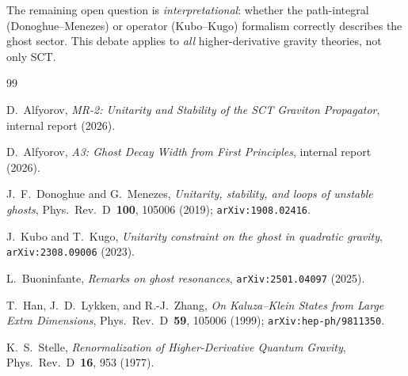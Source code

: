 \documentclass[11pt,a4paper]{article}
\begin{document}
The remaining open question is \emph{interpretational}: whether the
path-integral (Donoghue--Menezes) or operator (Kubo--Kugo) formalism
correctly describes the ghost sector.  This debate applies to \emph{all}
higher-derivative gravity theories, not only SCT.


\begin{thebibliography}{99}

D.~Alfyorov,
\textit{MR-2: Unitarity and Stability of the SCT Graviton Propagator},
internal report (2026).

D.~Alfyorov,
\textit{A3: Ghost Decay Width from First Principles},
internal report (2026).

J.~F.~Donoghue and G.~Menezes,
\textit{Unitarity, stability, and loops of unstable ghosts},
Phys.\ Rev.\ D~\textbf{100}, 105006 (2019);
\texttt{arXiv:1908.02416}.

J.~Kubo and T.~Kugo,
\textit{Unitarity constraint on the ghost in quadratic gravity},
\texttt{arXiv:2308.09006} (2023).

L.~Buoninfante,
\textit{Remarks on ghost resonances},
\texttt{arXiv:2501.04097} (2025).

T.~Han, J.~D.~Lykken, and R.-J.~Zhang,
\textit{On Kaluza--Klein States from Large Extra Dimensions},
Phys.\ Rev.\ D~\textbf{59}, 105006 (1999);
\texttt{arXiv:hep-ph/9811350}.

K.~S.~Stelle,
\textit{Renormalization of Higher-Derivative Quantum Gravity},
Phys.\ Rev.\ D~\textbf{16}, 953 (1977).

\end{thebibliography}
\end{document}
